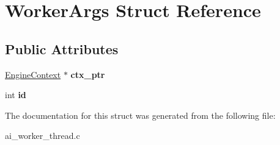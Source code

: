 \hypertarget{structWorkerArgs}{}\section{Worker\+Args Struct Reference}
\label{structWorkerArgs}
\subsection*{Public Attributes}
\begin{DoxyCompactItemize}
\item 
\mbox{\label{structWorkerArgs_aa3fadf739cf397b53d9c890ff1df7106}} 
\mbox{\hyperlink{structEngineContext}{Engine\+Context}} $\ast$ {\bfseries ctx\+\_\+ptr}
\item 
\mbox{\label{structWorkerArgs_a277706418f14fd642ac85fcb8b232115}} 
int {\bfseries id}
\end{DoxyCompactItemize}


The documentation for this struct was generated from the following file\+:\begin{DoxyCompactItemize}
\item 
ai\+\_\+worker\+\_\+thread.\+c\end{DoxyCompactItemize}
